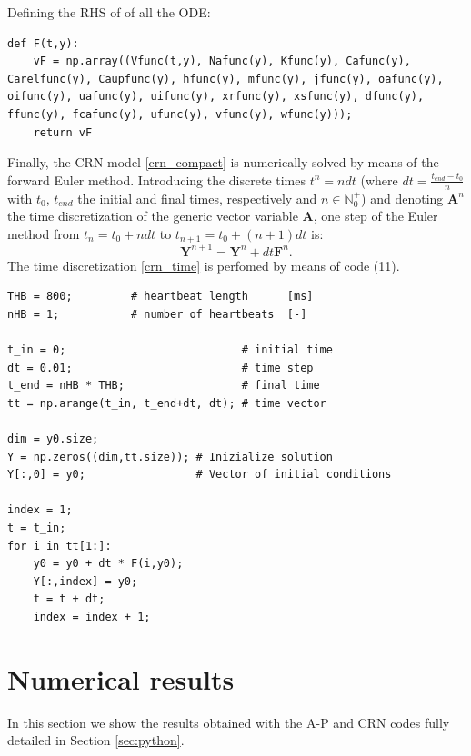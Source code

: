 \documentclass[11pt,a4paper]{article}
\begin{document}
Defining the RHS of of all the ODE:
\lstset{language=Python}
\lstset{frame=lines}
\lstset{basicstyle=\footnotesize}
\begin{lstlisting}
def F(t,y):
	vF = np.array((Vfunc(t,y), Nafunc(y), Kfunc(y), Cafunc(y), Carelfunc(y), Caupfunc(y), hfunc(y), mfunc(y), jfunc(y), oafunc(y), oifunc(y), uafunc(y), uifunc(y), xrfunc(y), xsfunc(y), dfunc(y), ffunc(y), fcafunc(y), ufunc(y), vfunc(y), wfunc(y)));
	return vF
\end{lstlisting}
Finally, the CRN model \eqref{crn_compact} is numerically solved by means of the forward Euler method. Introducing the discrete times $t^n=n dt$  (where $dt=\frac{t_{end}-t_{0}}{n}$ with $t_0$, $t_{end}$ the initial and final times, respectively and $n \in \mathbb {N}_0^+$) and denoting $\mathbf{A}^{n}$ the time discretization of the generic vector variable $\mathbf{A}$, one step of the Euler method from $t_n=t_0 + ndt$ to $t_{n+1}=t_0 + (n+1)dt$ is: 
\begin{equation}
\label{crn_time}
\mathbf{Y}^{n+1}=\mathbf{Y}^{n}+dt\mathbf{F}^n.
\end{equation}
The time discretization \eqref{crn_time} is perfomed by means of code (11).

\lstset{language=Python}
\lstset{frame=lines}
\lstset{basicstyle=\footnotesize}
\begin{lstlisting}
THB = 800;         # heartbeat length      [ms]
nHB = 1;           # number of heartbeats  [-]

t_in = 0;                           # initial time
dt = 0.01;                          # time step
t_end = nHB * THB;                  # final time
tt = np.arange(t_in, t_end+dt, dt); # time vector

dim = y0.size;  
Y = np.zeros((dim,tt.size)); # Inizialize solution
Y[:,0] = y0;                 # Vector of initial conditions

index = 1;
t = t_in;
for i in tt[1:]:
	y0 = y0 + dt * F(i,y0);
	Y[:,index] = y0;
	t = t + dt;
	index = index + 1;
\end{lstlisting}

\section{Numerical results}\label{sec:results}

In this section we show the results obtained with the A-P and CRN codes fully detailed in Section \ref{sec:python}.
\end{document}
